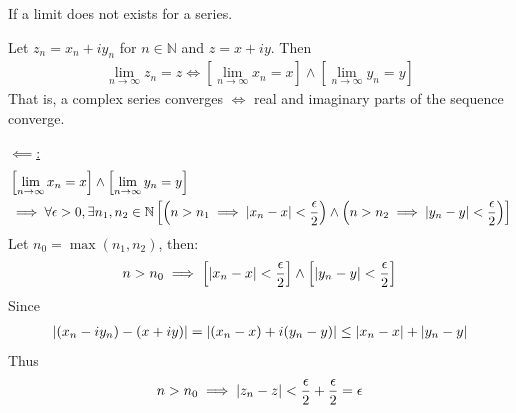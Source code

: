 \documentclass[12pt, english]{book}
\makeatletter
\renewenvironment{proof}[1][\proofname]{\par
	\pushQED{\qed}%
	\normalfont \topsep6\p@\@plus6\p@\relax
	\list{}{%
		\settowidth{\leftmargin}{\itshape\proofname:\hskip\labelsep}%
		\setlength{\labelwidth}{0pt}%
		\setlength{\itemindent}{-\leftmargin}%
	}%
	\item[\hskip\labelsep\itshape#1\@addpunct{:}]\ignorespaces
	}{ \popQED\endlist\@endpefalse}
\makeatother
\begin{document}
	\begin{definition}
		If a limit does not exists for a series.
	\end{definition}
	
	\begin{theorem}
		Let \(z_n = x_n + i y_n\) for \(n \in \mathbb{N}\) and \(z = x + iy\). Then 
		\begin{align*}
			\lim_{n \rightarrow \infty} z_n = z 
			\iff \left[\lim_{n \rightarrow \infty} x_n = x \right] \land 
				 \left[\lim_{n \rightarrow \infty} y_n = y \right] 
		\end{align*}
		That is, a complex series converges \(\iff\) real and imaginary parts of the sequence converge.
	\end{theorem}
	\begin{proof}
		\underline{\(\impliedby \):}		
		\begin{align*}
			&\left[\lim_{n \rightarrow \infty} x_n = x \right] \land 
			 \left[\lim_{n \rightarrow \infty} y_n = y \right] \\
			&\implies \forall \epsilon > 0, \exists n_1, n_2 \in \mathbb{N}
				\left[\left(n > n_1 \implies \abs{x_n - x} < \frac{\epsilon}{2}\right) \land \left(n > n_2 \implies \abs{y_n - y} < \frac{\epsilon}{2}\right)\right]
		\end{align*}
		Let \(n_0 = \max(n_1, n_2)\), then:
		\begin{align*}
			n > n_0 
			\implies \left[\abs{x_n - x} < \frac{\epsilon}{2} \right]
				\land \left[\abs{y_n - y} < \frac{\epsilon}{2} \right]
		\end{align*}
		Since
		\begin{align*}
			\abs{(x_n - i y_n) - (x + iy)} = \abs{(x_n - x) + i(y_n - y)} \leq \abs{x_n - x} + \abs{y_n - y}
		\end{align*}
		Thus 
		\begin{align*}
			n > n_0 \implies \abs{z_n - z} < \frac{\epsilon}{2} + \frac{\epsilon}{2} = \epsilon
		\end{align*}
		

\end{proof}
\end{document}
